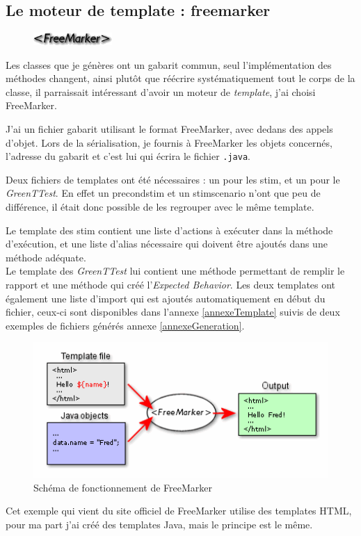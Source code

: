 		\subsection{Le moteur de template : freemarker}
		\begin{figure}
			\includegraphics[width=3cm]{contents/images/FreeMarker.png}
		\end{figure}
		Les classes que je génères ont un gabarit commun, seul l'implémentation des méthodes changent, ainsi plutôt que réécrire systématiquement tout le corps de la classe, il parraissait intéressant d'avoir un moteur de \textit{template}, j'ai choisi FreeMarker.

		J'ai un fichier gabarit utilisant le format FreeMarker, avec dedans des appels d'objet. Lors de la sérialisation, je fournis à FreeMarker les objets concernés, l'adresse du gabarit et c'est lui qui écrira le fichier \texttt{.java}.

		Deux fichiers de templates ont été nécessaires : un pour les stim, et un pour le \textit{GreenTTest}. En effet un precondstim et un stimscenario n'ont que peu de différence, il était donc possible de les regrouper avec le même template.

		Le template des stim contient une liste d'actions à exécuter dans la méthode d'exécution, et une liste d'alias nécessaire qui doivent être ajoutés dans une méthode adéquate. \\
		Le template des \textit{GreenTTest} lui contient une méthode permettant de remplir le rapport et une méthode qui créé l'\textit{Expected Behavior}.
		Les deux templates ont également une liste d'import qui est ajoutés automatiquement en début du fichier, ceux-ci sont disponibles dans l'annexe \ref{annexeTemplate} suivis de deux exemples de fichiers générés annexe \ref{annexeGeneration}.

	
		\begin{figure}[H]
		\centering
		\includegraphics[width=12cm]{contents/images/FreeMarkerSchema.png}
		\caption{Schéma de fonctionnement de FreeMarker}
		\end{figure}
		\begin{remarque}
		Cet exemple qui vient du site officiel de FreeMarker utilise des templates HTML, pour ma part j'ai créé des templates Java, mais le principe est le même.
		\end{remarque}